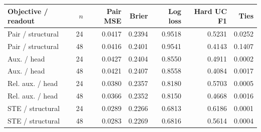 \begin{tabular}{lrrrrrr}
\toprule
Objective / readout & $n$ & Pair MSE & Brier & Log loss & Hard UC F1 & Ties \\
\midrule
Pair / structural & 24 & 0.0417 & 0.2394 & 0.9518 & 0.5231 & 0.0252 \\
Pair / structural & 48 & 0.0416 & 0.2401 & 0.9541 & 0.4143 & 0.1407 \\
Aux. / head & 24 & 0.0427 & 0.2404 & 0.8550 & 0.4911 & 0.0002 \\
Aux. / head & 48 & 0.0421 & 0.2407 & 0.8558 & 0.4084 & 0.0017 \\
Rel. aux. / head & 24 & 0.0380 & 0.2357 & 0.8180 & 0.5703 & 0.0005 \\
Rel. aux. / head & 48 & 0.0366 & 0.2352 & 0.8150 & 0.4668 & 0.0016 \\
STE / structural & 24 & 0.0289 & 0.2266 & 0.6813 & 0.6186 & 0.0001 \\
STE / structural & 48 & 0.0283 & 0.2269 & 0.6816 & 0.5614 & 0.0004 \\
\bottomrule
\end{tabular}
